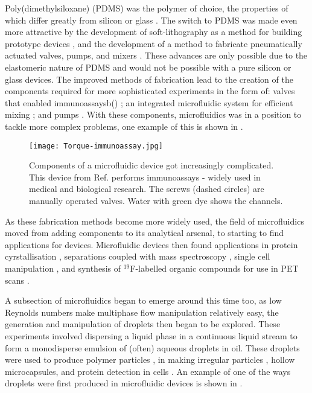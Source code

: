 Poly(dimethylsiloxane) (PDMS) was the polymer of choice, the properties of which differ greatly
from silicon or glass \citep{ng2002components,whitesides2001flexible}. The switch to PDMS was made even
more attractive by the development of soft-lithography as a method for building prototype
devices \citep{mcdonald2000fabrication}, and the development of a method to fabricate pneumatically actuated valves,
pumps, and mixers \citep{mcdonald2000fabrication}. These advances are only possible due to the elastomeric nature of PDMS
and would not be possible with a pure silicon or glass devices.
The improved methods of fabrication lead to the creation of the components required for more sophisticated
experiments in the form of: valves that enabled immunoassaysb() \citep{weibel2005torque}; an integrated
microfluidic system for efficient mixing \citep{gunther2005micromixing}; and pumps \citep{laser2004review}.
With these components, microfluidics was in a position to tackle more complex problems, one example of this is shown in .


\begin{figure}
  \begin{center}
  \texttt{[image: Torque-immunoassay.jpg]}
  \end{center}
  \caption{Components of a microfluidic device got increasingly complicated. This device from Ref.\citep{weibel2005torque} performs
  immunoassays - widely used in medical and biological research. The screws (dashed circles) are manually operated valves. Water with green dye
  shows the channels.}
  \label{fig:immunoassay}
\end{figure}


As these fabrication methods become more widely used, the field of microfluidics moved from
adding components to its analytical arsenal, to starting to find applications for devices.
Microfluidic devices then found applications in protein cyrstallisation \citep{hansen2002robust},
separations coupled with mass spectroscopy \citep{ramsey1997generating}, single cell manipulation \citep{wheeler2003microfluidic},
and synthesis of $^{19}$F-labelled organic compounds for use in PET scans \citep{lee2005multistep}.

A subsection of microfluidics began to emerge around this time too, as
low Reynolds numbers make multiphase flow manipulation
relatively easy, the generation and manipulation of droplets \citep{thorsen2001dynamic, link2004geometrically, tan2004design} then began to be explored.
These experiments involved dispersing a liquid phase in a continuous
liquid stream to form a monodisperse emulsion of (often) aqueous droplets in oil. These droplets
were used to produce polymer particles \citep{nie2005polymer}, in making irregular particles \citep{nisisako2007formation},
hollow microcapsules\citep{utada2005monodisperse}, and protein detection in cells \citep{huebner2007quantitative}. An example of one of the ways droplets were first
produced in microfluidic devices is shown in .

